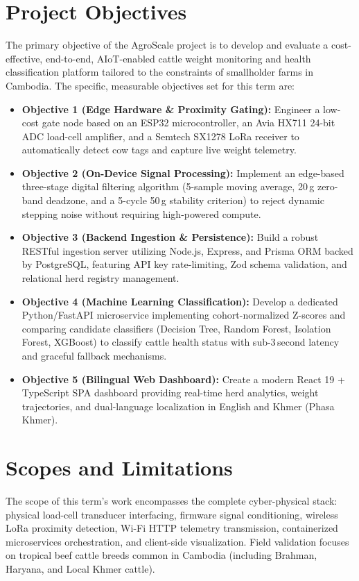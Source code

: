 \documentclass[11pt,a4paper]{report}
\begin{document}
\section{Project Objectives}
The primary objective of the AgroScale project is to develop and evaluate a cost-effective, end-to-end, AIoT-enabled cattle weight monitoring and health classification platform tailored to the constraints of smallholder farms in Cambodia. The specific, measurable objectives set for this term are:
\begin{itemize}
    \item \textbf{Objective 1 (Edge Hardware \& Proximity Gating):} Engineer a low-cost gate node based on an ESP32 microcontroller, an Avia HX711 24-bit ADC load-cell amplifier, and a Semtech SX1278 LoRa receiver to automatically detect cow tags and capture live weight telemetry.
    \item \textbf{Objective 2 (On-Device Signal Processing):} Implement an edge-based three-stage digital filtering algorithm (5-sample moving average, 20\,g zero-band deadzone, and a 5-cycle 50\,g stability criterion) to reject dynamic stepping noise without requiring high-powered compute.
    \item \textbf{Objective 3 (Backend Ingestion \& Persistence):} Build a robust RESTful ingestion server utilizing Node.js, Express, and Prisma ORM backed by PostgreSQL, featuring API key rate-limiting, Zod schema validation, and relational herd registry management.
    \item \textbf{Objective 4 (Machine Learning Classification):} Develop a dedicated Python/FastAPI microservice implementing cohort-normalized Z-scores and comparing candidate classifiers (Decision Tree, Random Forest, Isolation Forest, XGBoost) to classify cattle health status with sub-3\,second latency and graceful fallback mechanisms.
    \item \textbf{Objective 5 (Bilingual Web Dashboard):} Create a modern React 19 + TypeScript SPA dashboard providing real-time herd analytics, weight trajectories, and dual-language localization in English and Khmer (Phasa Khmer).
\end{itemize}

\section{Scopes and Limitations}
The scope of this term's work encompasses the complete cyber-physical stack: physical load-cell transducer interfacing, firmware signal conditioning, wireless LoRa proximity detection, Wi-Fi HTTP telemetry transmission, containerized microservices orchestration, and client-side visualization. Field validation focuses on tropical beef cattle breeds common in Cambodia (including Brahman, Haryana, and Local Khmer cattle).
\end{document}
